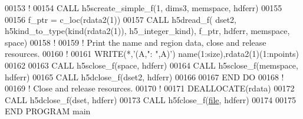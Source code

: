 \begin{DoxyCode}
00153      \textcolor{comment}{!}
00154      \textcolor{keyword}{CALL }h5screate\_simple\_f(1, dims3, memspace, hdferr)
00155 
00156      f\_ptr = c\_loc(rdata2(1))
00157      \textcolor{keyword}{CALL }h5dread\_f( dset2, h5kind\_to\_type(kind(rdata2(1)), h5\_integer\_kind), f\_ptr, hdferr, memspace, 
      space)
00158      \textcolor{comment}{!}
00159      \textcolor{comment}{! Print the name and region data, close and release resources.}
00160      \textcolor{comment}{!}
00161      \textcolor{keyword}{WRITE}(*,\textcolor{stringliteral}{'(A,": ",A)'}) name(1:size),rdata2(1)(1:npoints) 
00162 
00163      \textcolor{keyword}{CALL }h5sclose\_f(space, hdferr)
00164      \textcolor{keyword}{CALL }h5sclose\_f(memspace, hdferr)
00165      \textcolor{keyword}{CALL }h5dclose\_f(dset2, hdferr)
00166 
00167 \textcolor{keywordflow}{  END DO}
00168   \textcolor{comment}{!}
00169   \textcolor{comment}{! Close and release resources.}
00170   \textcolor{comment}{!}
00171   \textcolor{keyword}{DEALLOCATE}(rdata)
00172   \textcolor{keyword}{CALL }h5dclose\_f(dset, hdferr)
00173   \textcolor{keyword}{CALL }h5fclose\_f(\hyperlink{structfile}{file}, hdferr)
00174 
00175 \textcolor{keyword}{END PROGRAM }main
\end{DoxyCode}
